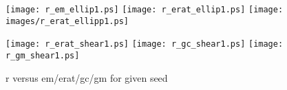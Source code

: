 \documentclass{article}
\begin{document}
\begin{figure}[htp]
\centering
\texttt{[image: r\_em\_ellip1.ps]}\quad
\texttt{[image: r\_erat\_ellip1.ps]}\quad
\texttt{[image: images/r\_erat\_ellipp1.ps]}

\medskip

\texttt{[image: r\_erat\_shear1.ps]}\quad
\texttt{[image: r\_gc\_shear1.ps]}\quad
\texttt{[image: r\_gm\_shear1.ps]}

\caption{r versus em/erat/gc/gm for given seed }
\label{pics:1}
\end{figure}
\end{document}
